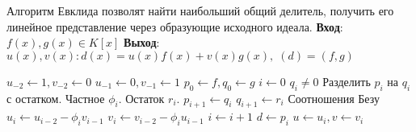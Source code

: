 \pagebreak

Алгоритм Евклида позволят найти наибольший общий делитель, получить его линейное представление через
образующие исходного идеала. {\bf Вход}: $ f(x), g(x) \in K[x] $ \newline
{\bf Выход}: $ u(x), v(x) : d(x) = u(x)f(x) + v(x)g(x), \; (d) = (f,g) $

\begin{codebox}
  \li $ u_{-2} \gets 1, v_{-2} \gets 0 $
  \li $ u_{-1} \gets 0, v_{-1} \gets 1 $
  \li $ p_{0} \gets f, q_{0} \gets g $ 
  \li $ i \gets 0 $
  \li \While $ q_{i} \ne 0 $ 
  \li \Do Разделить $ p_{i} $ на $ q_{i} $ с остатком. 
      \li \Comment Частное $ \phi_{i} $. Остаток $ r_{i} $.
      \li $ p_{i+1} \gets q_{i} $
      \li $ q_{i+1} \gets r_{i} $
      \li \Comment Соотношения Безу
      \li $ u_{i} \gets u_{i-2} - \phi_{i}v_{i-1} $
      \li $ v_{i} \gets v_{i-2} - \phi_{i}u_{i-1} $
      \li $ i \gets i + 1 $
      \End
  \li $ d \gets p_{i} $
  \li $ u \gets u_{i}, v \gets v_{i} $
\end{codebox}





